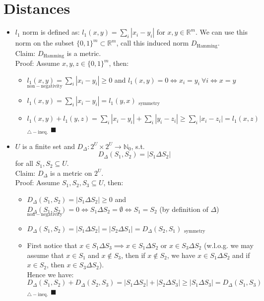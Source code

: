 \section{Distances}
\begin{itemize}
\item \(l_1\) norm is defined as: \(l_1(x,y) = \sum_i |x_i-y_i|\) for \(x,y \in \mathbb R ^m\). We can use this norm on the subset \(\{0,1\}^m \subset \mathbb R ^m\), call this induced norm \(D_{\mathrm{Hamming}}\).
\\
Claim: \(D_{\mathrm{Hamming}}\) is a metric.
\\
Proof: Assume \(x,y,z \in \{0,1\}^m\), then:
\begin{itemize}
\item \(l_1(x,y) = \sum_i |x_i-y_i| \geq 0\) and \(l_1(x,y) = 0 \iff x_i = y_i\ \forall i \iff x= y\) \checkmark\(_{\mathrm{non-negativity}}\)
\item \(l_1(x,y) = \sum_i |x_i-y_i| = l_1(y,x) \) \checkmark\(_{\mathrm{symmetry}}\)
\item \(l_1(x,y)+l_1(y,z) = \sum_i |x_i-y_i| + \sum_i |y_i-z_i| \geq \sum_i |x_i-z_i| = l_1(x,z)\) \checkmark\(_{\mathrm{\triangle -ineq.}}\) \(\blacksquare\)
\end{itemize}
\item \(U\) is a finite set and \(D_\Delta : 2^U \times 2^U \to \mathbb N_0\), s.t.
\[ D_\Delta(S_1,S_2) = |S_1 \Delta S_2| \]
for all \(S_1,S_2 \subseteq U\).
\\
Claim: \(D_\Delta\) is a metric on \(2^U\).
\\
Proof: Assume \(S_1,S_2,S_3 \subseteq U\), then:
\begin{itemize}
\item \(D_\Delta(S_1,S_2) =  |S_1 \Delta S_2| \geq 0\) and \(D_\Delta(S_1,S_2) = 0 \iff S_1 \Delta S_2 = \emptyset \iff S_1 = S_2\) (by definition of \(\Delta\)) \checkmark\(_{\mathrm{non-negativity}}\)
\item \(D_\Delta(S_1,S_2) =  |S_1 \Delta S_2| = |S_2 \Delta S_1|  = D_\Delta(S_2,S_1)\) \checkmark\(_{\mathrm{symmetry}}\)
\item First notice that \(x\in S_1 \Delta S_3 \implies x\in S_1 \Delta S_2\) or \(x \in S_3 \Delta S_2\) (w.l.o.g. we may assume that \(x\in S_1\) and \(x\not\in S_3\), then if \(x\not\in S_2\), we have \(x\in S_1 \Delta S_2\) and if \(x \in S_2\), then \(x\in S_3 \Delta S_2\)).
\\
Hence we have:
\[ D_\Delta(S_1,S_2) + D_\Delta(S_2,S_3) =  |S_1 \Delta S_2| +  |S_2 \Delta S_3| \geq  |S_1 \Delta S_3| =
 D_\Delta(S_1,S_3) \]
\checkmark\(_{\mathrm{\triangle -ineq.}}\) \(\blacksquare\)



\end{itemize}


\end{itemize}